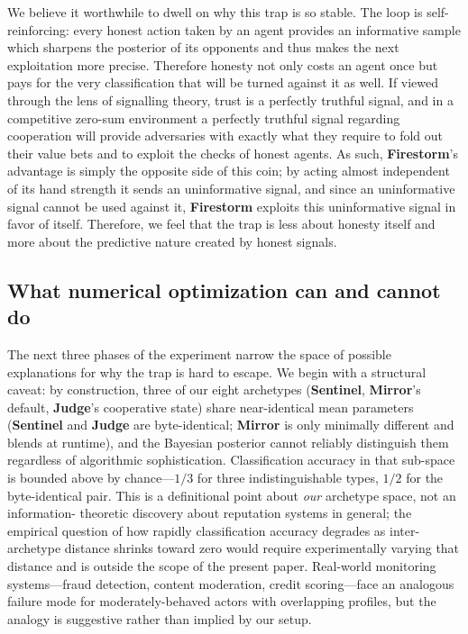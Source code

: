 \documentclass[10pt]{article} %
\newcommand{\arch}[1]{\textbf{#1}}
\begin{document}
We believe it worthwhile to dwell on why this trap is so stable. The loop is
self-reinforcing: every honest action taken by an agent provides an informative
sample which sharpens the posterior of its opponents and thus makes the next
exploitation more precise. Therefore honesty not only costs an agent once but
pays for the very classification that will be turned against it as well. If
viewed through the lens of signalling theory, trust is a perfectly truthful
signal, and in a competitive zero-sum environment a perfectly truthful signal
regarding cooperation will provide adversaries with exactly what they require to
fold out their value bets and to exploit the checks of honest agents. As such,
\arch{Firestorm}'s advantage is simply the opposite side of this coin; by acting
almost independent of its hand strength it sends an uninformative signal, and
since an uninformative signal cannot be used against it, \arch{Firestorm}
exploits this uninformative signal in favor of itself. Therefore, we feel that
the trap is less about honesty itself and more about the predictive nature
created by honest signals.

\subsection{What numerical optimization can and cannot do}
The next three phases of the experiment narrow the space of
possible explanations for why the trap is hard to escape. We
begin with a structural caveat: by construction, three of our
eight archetypes (\arch{Sentinel}, \arch{Mirror}'s default,
\arch{Judge}'s cooperative state) share near-identical mean
parameters (\arch{Sentinel} and \arch{Judge} are byte-identical;
\arch{Mirror} is only minimally different and blends at runtime),
and the Bayesian posterior cannot reliably distinguish them
regardless of algorithmic sophistication. Classification accuracy
in that sub-space is bounded above by chance---$1/3$ for three
indistinguishable types, $1/2$ for the byte-identical pair. This is a definitional
point about \textit{our} archetype space, not an information-
theoretic discovery about reputation systems in general; the
empirical question of how rapidly classification accuracy degrades
as inter-archetype distance shrinks toward zero would require
experimentally varying that distance and is outside the scope of
the present paper. Real-world monitoring systems---fraud
detection, content moderation, credit scoring---face an analogous
failure mode for moderately-behaved actors with overlapping
profiles, but the analogy is suggestive rather than implied by
our setup.
\end{document}
